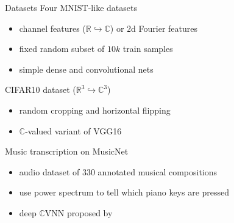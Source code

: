 \documentclass{beamer}
\newcommand{\real}{\mathbb{R}}
\newcommand{\cplx}{\mathbb{C}}
\begin{document}
\begin{frame}[t]{Datasets}{\insertsection}
  Four MNIST-like datasets
  \begin{itemize}
    \item channel features ($\real \hookrightarrow \cplx$) or $2$d Fourier features
    \item fixed random subset of $10k$ train samples
    \item simple dense and convolutional nets
  \end{itemize}

  \medskip
  CIFAR10 dataset ($\real^3 \hookrightarrow \cplx^3$)
  \begin{itemize}
    \item random cropping and horizontal flipping
    \item $\cplx$-valued variant of VGG16 {\tiny \citep{simonyan_very_2015}}
  \end{itemize}

  \medskip
  Music transcription on MusicNet {\tiny \citep{thickstun_learning_2017}}
  \begin{itemize}
    \item audio dataset of $330$ annotated musical compositions
    \item use power spectrum to tell which piano keys are pressed
    \item deep $\cplx$VNN proposed by \citep{trabelsi_deep_2018}
  \end{itemize}
\end{frame}
\end{document}
